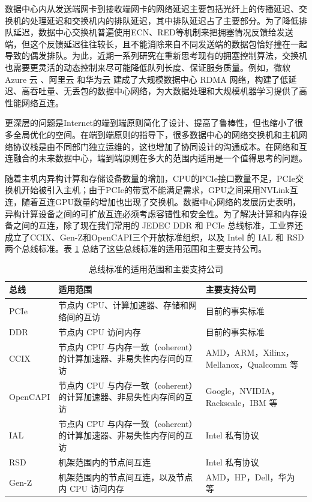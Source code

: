 数据中心内从发送端网卡到接收端网卡的网络延迟主要包括光纤上的传播延迟、交换机的处理延迟和交换机内的排队延迟，其中排队延迟占了主要部分。为了降低排队延迟，数据中心交换机普遍使用ECN、RED等机制来把拥塞情况反馈给发送端，但这个反馈延迟往往较长，且不能消除来自不同发送端的数据包恰好撞在一起导致的偶发排队。为此，近期一系列研究在重新思考现有的拥塞控制算法，交换机也需要更灵活的动态控制来尽可能降低队列长度、保证服务质量。例如，微软 Azure 云 \cite{guo2016rdma}、阿里云 \cite{aliyun-rdma} 和华为云 \cite{huawei-lossless} 建成了大规模数据中心 RDMA 网络，构建了低延迟、高吞吐量、无丢包的数据中心网络，为大数据处理和大规模机器学习提供了高性能网络互连。

更深层的问题是Internet的端到端原则简化了设计、提高了鲁棒性，但也缩小了很多全局优化的空间。在端到端原则的指导下，很多数据中心的网络交换机和主机网络协议栈是由不同部门独立运维的，这也增加了协同设计的沟通成本。在网络和互连融合的未来数据中心，端到端原则在多大的范围内适用是一个值得思考的问题。

随着主机内异构计算和存储设备数量的增加，CPU的PCIe接口数量不足，PCIe交换机开始被引入主机；由于PCIe的带宽不能满足需求，GPU之间采用NVLink互连，随着互连GPU数量的增加也出现了交换机。数据中心网络的发展历史表明，异构计算设备之间的可扩放互连必须考虑容错性和安全性。为了解决计算和内存设备之间的互连，除了现在我们常用的 JEDEC DDR 和 PCIe 总线标准，工业界还成立了CCIX、Gen-Z和OpenCAPI三个开放标准组织，以及 Intel 的 IAL 和 RSD 两个总线标准。表 \ref{background:tab:ccix-pcie} 总结了这些总线标准的适用范围和主要支持公司。

\begin{table}[htbp]
	\begin{tabular}{l|p{}|p{}}
		\hline
		总线 & 适用范围 & 主要支持公司 \\
		\hline
		\hline
		PCIe & 节点内 CPU、计算加速器、存储和网络间的互访 & 目前的事实标准 \\
		\hline
		DDR & 节点内 CPU 访问内存 & 目前的事实标准 \\
		\hline
		CCIX & 节点内 CPU 与内存一致（coherent）的计算加速器、非易失性内存间的互访 & AMD，ARM，Xilinx，Mellanox，Qualcomm 等 \\
		\hline
		OpenCAPI & 节点内 CPU 与内存一致（coherent）的计算加速器、非易失性内存间的互访 & Google，NVIDIA，Rackscale，IBM 等 \\
		\hline
		IAL & 节点内 CPU 与内存一致（coherent）的计算加速器、非易失性内存间的互访 & Intel 私有协议 \\
		\hline
		RSD & 机架范围内的节点间互连 & Intel 私有协议 \\
		\hline
		Gen-Z & 机架范围内的节点间互连，以及节点内 CPU 访问内存 & AMD，HP，Dell，华为等 \\
		\hline
	\end{tabular}
	\caption{总线标准的适用范围和主要支持公司}
	\label{background:tab:ccix-pcie}
\end{table}

